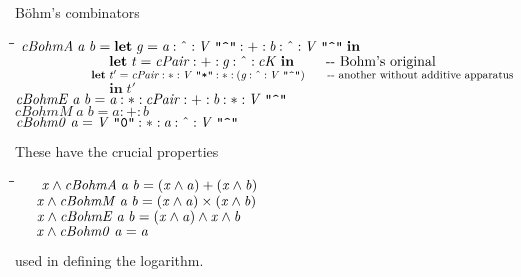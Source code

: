 \documentclass{article}
\newlength{\lwidth}\setlength{\lwidth}{4.5cm}
\newlength{\cwidth}\setlength{\cwidth}{8mm} %
\newcommand{\Conid}[1]{\mathit{#1}}
\newcommand{\Varid}[1]{\mathit{#1}}
\begin{document}
B{\"o}hm's combinators
\begin{tabbing}
\qquad\=\hspace{\lwidth}\=\hspace{\cwidth}\=\+\kill
${\Varid{cBohmA}\;\Varid{a}\;\Varid{b}\mathrel{=}\mathbf{let}\;\Varid{g}\mathrel{=}\Varid{a}\mathbin{:\char94 :}\Conid{V}\;\text{\ttfamily \char34 \char94 \char34}\mathbin{:+:}\Varid{b}\mathbin{:\char94 :}\Conid{V}\;\text{\ttfamily \char34 \char94 \char34}\;\mathbf{in}}$\\
${\phantom{\Varid{cBohmA}\;\Varid{a}\;\Varid{b}\mathrel{=}\mbox{}}\mathbf{let}\;\Varid{t}\mathrel{=}\Varid{cPair}\mathbin{:+:}\Varid{g}\mathbin{:\char94 :}\Varid{cK}\;\mathbf{in}\;\mbox{\qquad-{}-  Bohm's original}}$\\
${\phantom{\Varid{cBohmA}\;\Varid{a}\;\Varid{b}\mathrel{=}\mbox{}}\mathbf{let}\;\Varid{t'}\mathrel{=}\Varid{cPair}\mathbin{:*:}\Conid{V}\;\text{\ttfamily \char34 *\char34}\mathbin{:*:}(\Varid{g}\mathbin{:\char94 :}\Conid{V}\;\text{\ttfamily \char34 \char94 \char34})\mbox{\qquad-{}-  another without additive apparatus }}$\\
${\phantom{\Varid{cBohmA}\;\Varid{a}\;\Varid{b}\mathrel{=}\mbox{}}\mathbf{in}\;\Varid{t'}}$\\
${\Varid{cBohmE}\;\Varid{a}\;\Varid{b}\mathrel{=}\Varid{a}\mathbin{:*:}\Varid{cPair}\mathbin{:+:}\Varid{b}\mathbin{:*:}\Conid{V}\;\text{\ttfamily \char34 \char94 \char34}}$\\
${\Varid{cBohmM}\;\Varid{a}\;\Varid{b}\mathrel{=}\Varid{a}\mathbin{:+:}\Varid{b}}$\\
${\Varid{cBohm0}\;\Varid{a}\mathrel{=}\Conid{V}\;\text{\ttfamily \char34 0\char34}\mathbin{:*:}\Varid{a}\mathbin{:\char94 :}\Conid{V}\;\text{\ttfamily \char34 \char94 \char34}}$
\end{tabbing}These have the crucial properties
\begin{tabbing}
\qquad\=\hspace{\lwidth}\=\hspace{\cwidth}\=\+\kill
${\hskip1.50em\relax\Varid{x}\wedge\Varid{cBohmA}\;\Varid{a}\;\Varid{b}\mathrel{=}(\Varid{x}\wedge\Varid{a})\mathbin{+}(\Varid{x}\wedge\Varid{b})}$\\
${\hskip1.50em\relax\Varid{x}\wedge\Varid{cBohmM}\;\Varid{a}\;\Varid{b}\mathrel{=}(\Varid{x}\wedge\Varid{a})\times(\Varid{x}\wedge\Varid{b})}$\\
${\hskip1.50em\relax\Varid{x}\wedge\Varid{cBohmE}\;\Varid{a}\;\Varid{b}\mathrel{=}(\Varid{x}\wedge\Varid{a})\wedge\Varid{x}\wedge\Varid{b}}$\\
${\hskip1.50em\relax\Varid{x}\wedge\Varid{cBohm0}\;\Varid{a}\mathrel{=}\Varid{a}}$
\end{tabbing}used in defining the logarithm.
\end{document}
